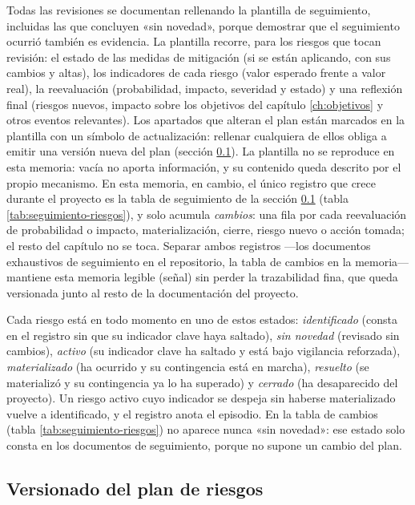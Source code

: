 Todas las revisiones se documentan rellenando la plantilla de seguimiento, incluidas las que concluyen «sin novedad», porque demostrar que el seguimiento ocurrió también es evidencia.
La plantilla recorre, para los riesgos que tocan revisión: el estado de las medidas de mitigación (si se están aplicando, con sus cambios y altas), los indicadores de cada riesgo (valor esperado frente a valor real), la reevaluación (probabilidad, impacto, severidad y estado) y una reflexión final (riesgos nuevos, impacto sobre los objetivos del capítulo \ref{ch:objetivos} y otros eventos relevantes).
Los apartados que alteran el plan están marcados en la plantilla con un símbolo de actualización: rellenar cualquiera de ellos obliga a emitir una versión nueva del plan (sección \ref{sec:riesgos-versionado}).
La plantilla no se reproduce en esta memoria: vacía no aporta información, y su contenido queda descrito por el propio mecanismo.
En esta memoria, en cambio, el único registro que crece durante el proyecto es la tabla de seguimiento de la sección \ref{sec:riesgos-versionado} (tabla \ref{tab:seguimiento-riesgos}), y solo acumula \emph{cambios}: una fila por cada reevaluación de probabilidad o impacto, materialización, cierre, riesgo nuevo o acción tomada; el resto del capítulo no se toca.
Separar ambos registros —los documentos exhaustivos de seguimiento en el repositorio, la tabla de cambios en la memoria— mantiene esta memoria legible (señal) sin perder la trazabilidad fina, que queda versionada junto al resto de la documentación del proyecto.

Cada riesgo está en todo momento en uno de estos estados: \emph{identificado} (consta en el registro sin que su indicador clave haya saltado), \emph{sin novedad} (revisado sin cambios), \emph{activo} (su indicador clave ha saltado y está bajo vigilancia reforzada), \emph{materializado} (ha ocurrido y su contingencia está en marcha), \emph{resuelto} (se materializó y su contingencia ya lo ha superado) y \emph{cerrado} (ha desaparecido del proyecto).
Un riesgo activo cuyo indicador se despeja sin haberse materializado vuelve a identificado, y el registro anota el episodio.
En la tabla de cambios (tabla \ref{tab:seguimiento-riesgos}) no aparece nunca «sin novedad»: ese estado solo consta en los documentos de seguimiento, porque no supone un cambio del plan.

\subsection{Versionado del plan de riesgos}
\label{sec:riesgos-versionado}


